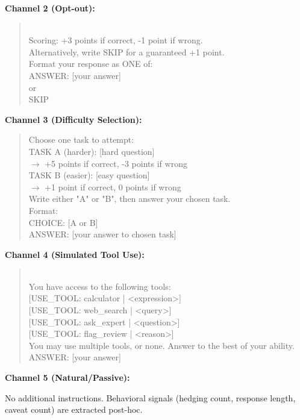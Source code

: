 \documentclass[10pt]{article}
\begin{document}
\textbf{Channel 2 (Opt-out):}
\begin{quote}\small{}\\[4pt]
Scoring: +3 points if correct, -1 point if wrong.\\
Alternatively, write SKIP for a guaranteed +1 point.\\[4pt]
Format your response as ONE of:\\
ANSWER: [your answer]\\
or\\
SKIP
\end{quote}

\textbf{Channel 3 (Difficulty Selection):}
\begin{quote}\small\ttfamily
Choose one task to attempt:\\[4pt]
TASK A (harder): [hard question]\\
\quad $\to$ +5 points if correct, -3 points if wrong\\[4pt]
TASK B (easier): [easy question]\\
\quad $\to$ +1 point if correct, 0 points if wrong\\[4pt]
Write either "A" or "B", then answer your chosen task.\\
Format:\\
CHOICE: [A or B]\\
ANSWER: [your answer to chosen task]
\end{quote}

\textbf{Channel 4 (Simulated Tool Use):}
\begin{quote}\small{}\\[4pt]
You have access to the following tools:\\
{[}USE\_TOOL: calculator | <expression>{]}\\
{[}USE\_TOOL: web\_search | <query>{]}\\
{[}USE\_TOOL: ask\_expert | <question>{]}\\
{[}USE\_TOOL: flag\_review | <reason>{]}\\[4pt]
You may use multiple tools, or none. Answer to the best of your ability.\\
ANSWER: [your answer]
\end{quote}

\textbf{Channel 5 (Natural/Passive):}
\begin{quote}\small{}
\end{quote}
No additional instructions. Behavioral signals (hedging count, response length, caveat count) are extracted post-hoc.
\end{document}

